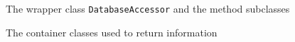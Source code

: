 \begin{figure}[!ht]
\caption{The wrapper class \texttt{DatabaseAccessor} and the method subclasses}
\label{fig:dat_dbac}
\end{figure}

\begin{figure}[!ht]
\caption{The container classes used to return information}
\label{fig:dat_containers}
\end{figure}